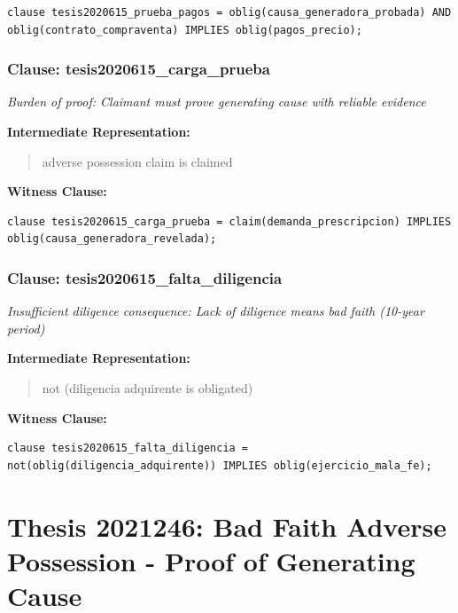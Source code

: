 \documentclass[11pt,a4paper]{article}
\begin{document}
\begin{lstlisting}[style=witnessstyle, language=Witness]
clause tesis2020615_prueba_pagos = oblig(causa_generadora_probada) AND oblig(contrato_compraventa) IMPLIES oblig(pagos_precio);
\end{lstlisting}

\subsubsection{Clause: tesis2020615\_carga\_prueba}

\textit{Burden of proof: Claimant must prove generating cause with reliable evidence}

\textbf{Intermediate Representation:}

\begin{quote}
adverse possession claim is claimed
\end{quote}

\textbf{Witness Clause:}

\begin{lstlisting}[style=witnessstyle, language=Witness]
clause tesis2020615_carga_prueba = claim(demanda_prescripcion) IMPLIES oblig(causa_generadora_revelada);
\end{lstlisting}

\subsubsection{Clause: tesis2020615\_falta\_diligencia}

\textit{Insufficient diligence consequence: Lack of diligence means bad faith (10-year period)}

\textbf{Intermediate Representation:}

\begin{quote}
not (diligencia adquirente is obligated)
\end{quote}

\textbf{Witness Clause:}

\begin{lstlisting}[style=witnessstyle, language=Witness]
clause tesis2020615_falta_diligencia = not(oblig(diligencia_adquirente)) IMPLIES oblig(ejercicio_mala_fe);
\end{lstlisting}

\newpage

\section{Thesis 2021246: Bad Faith Adverse Possession - Proof of Generating Cause}
\label{thesis:2021246}
\end{document}

